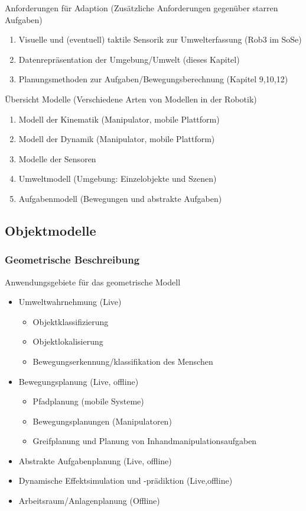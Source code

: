 \documentclass[paper=a4, fontsize=11pt]{scrartcl} %
\numberwithin{equation}{section} %
\numberwithin{figure}{section} %
\numberwithin{table}{section} %
\begin{document}
Anforderungen für Adaption (Zusätzliche Anforderungen gegenüber starren Aufgaben)
\begin{enumerate}
\item Visuelle und (eventuell) taktile Sensorik zur Umwelterfassung (Rob3 im SoSe)
\item Datenrepräsentation der Umgebung/Umwelt (dieses Kapitel)
\item Planungsmethoden zur Aufgaben/Bewegungsberechnung (Kapitel 9,10,12)
\end{enumerate}

Übersicht Modelle (Verschiedene Arten von Modellen in der Robotik)
\begin{enumerate}
\item Modell der Kinematik (Manipulator, mobile Plattform)
\item Modell der Dynamik (Manipulator, mobile Plattform)
\item Modelle der Sensoren
\item Umweltmodell (Umgebung: Einzelobjekte und Szenen)
\item Aufgabenmodell (Bewegungen und abstrakte Aufgaben)
\end{enumerate}

\subsection{Objektmodelle}

\subsubsection{Geometrische Beschreibung}

Anwendungsgebiete für das geometrische Modell
\begin{itemize}
\item Umweltwahrnehmung (Live)
\begin{itemize}
\item Objektklassifizierung
\item Objektlokalisierung
\item Bewegungserkennung/klassifikation des Menschen
\end{itemize}
\item Bewegungsplanung (Live, offline)
\begin{itemize}
\item Pfadplanung (mobile Systeme)
\item Bewegungsplanungen (Manipulatoren)
\item Greifplanung und Planung von Inhandmanipulationsaufgaben
\end{itemize}
\item Abstrakte Aufgabenplanung (Live, offline)
\item Dynamische Effektsimulation und -prädiktion (Live,offline)
\item Arbeitsraum/Anlagenplanung (Offline)
\end{itemize}
\end{document}

